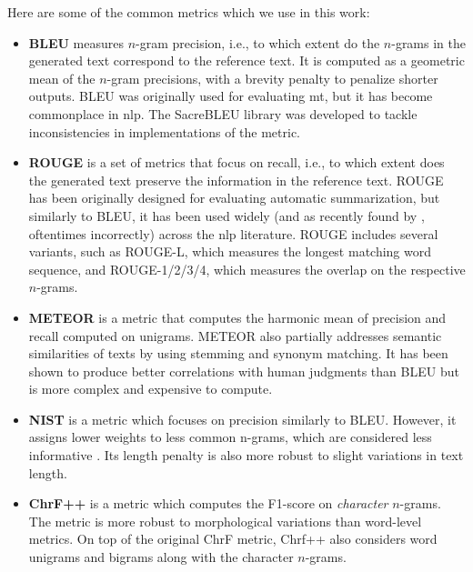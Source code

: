 {Here are some of the common metrics which we use in this work:

\begin{itemize}
    \item \textbf{BLEU} \cite{papineni2002bleu} measures $n$-gram precision, i.e., to which extent do the $n$-grams in the generated text correspond to the reference text.  It is computed as a geometric mean of the $n$-gram precisions, with a brevity penalty to penalize shorter outputs. BLEU was originally used for evaluating \ac{mt}, but it has become commonplace in \ac{nlp}. The SacreBLEU library \cite{post2018call}  was developed to tackle inconsistencies in implementations of the metric.
    \item \textbf{ROUGE} \cite{lin-2004-rouge} is a set of metrics that focus on recall, i.e., to which extent does the generated text preserve the information in the reference text. ROUGE has been originally designed for evaluating automatic summarization, but similarly to BLEU, it has been used widely (and as recently found by \citet{gruskyRogueScores2023}, oftentimes incorrectly) across the \ac{nlp} literature. ROUGE includes several variants, such as ROUGE-L, which measures the longest matching word sequence, and ROUGE-{1/2/3/4}, which measures the overlap on the respective $n$-grams.
    \item \textbf{METEOR} \cite{banerjee-lavie-2005-meteor} is a metric that computes the harmonic mean of precision and recall computed on unigrams. METEOR also partially addresses semantic similarities of texts by using stemming and synonym matching. It has been shown to produce better correlations with human judgments than BLEU \cite{agarwal2008meteor} but is more complex and expensive to compute.
    \item \textbf{NIST} \cite{martin2000nist} is a metric which focuses on precision similarly to BLEU. However, it assigns lower weights to less common n-grams, which are considered less informative \cite{doddington2002automatic}. Its length penalty is also more robust to slight variations in text length.
    \item \textbf{ChrF++} \cite{popovic2015chrf,popovic2017chrf} is a metric which computes the F1-score on \emph{character} $n$-grams. The metric is more robust to morphological variations than word-level metrics. On top of the original ChrF metric, Chrf++ also considers word unigrams and bigrams along with the character $n$-grams.
\end{itemize}
}
